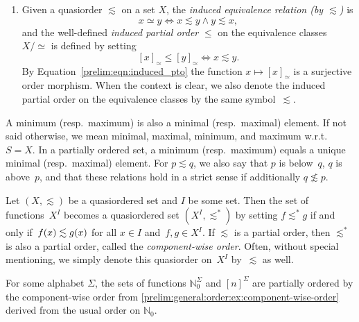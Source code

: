 \begin{enumerate}
 \item Given a quasiorder $\lesssim$ on a set $X$, the \emph{induced equivalence relation (by $\lesssim$)} is
 \begin{equation}\label{prelim:eqn:induced_eqrel}
 	x \simeq y \Leftrightarrow x \lesssim y \land y \lesssim x,
 \end{equation}
 and the well-defined \emph{induced partial order} $\le$
 on the equivalence classes $X / {\simeq}$ 
 is defined by setting
 \begin{equation}\label{prelim:eqn:induced_pto}
 	[x]_{\simeq} \le [y]_{\simeq} \Leftrightarrow x \lesssim y.
 \end{equation}  
 By Equation~\eqref{prelim:eqn:induced_pto}
 the function $x \mapsto [x]_{\simeq}$ is a surjective order morphism.
 When the context is clear, we also denote
 the induced partial order on the equivalence classes by the same symbol~$\lesssim$.
\end{enumerate}

A minimum (resp.~maximum) is also a minimal (resp.~maximal) element. 
If not said otherwise, 
we mean minimal, maximal, minimum, and maximum w.r.t.~$S = X$. 
In a partially ordered set, a minimum (resp.~maximum) equals a unique minimal (resp.~maximal) element.
For $p \lesssim q$, we also say that $p$ is below~$q$, $q$ is above~$p$,
and that  these relations hold in a strict sense if additionally $q \not\lesssim p$.


\begin{example}\label{prelim:general:order:ex:component-wise-order}
Let $(X, \lesssim)$ be a quasiordered set and $I$ be some set.
Then the set of functions~$X^I$ becomes a quasiordered set $(X^I, \lesssim^*)$
by setting $f \lesssim^*  g$ if and only if~$\applyfunc{x}{f} \lesssim \applyfunc{x}{g}$ for all $x \in I$
and~$f,g \in X^I$. If $\lesssim$ is a partial order, then $\lesssim^*$ is also a partial order,
called the \emph{component-wise order}.
Often, without special mentioning, 
we simply denote this quasiorder on~$X^I$ by~$\lesssim$ as well.
\end{example}
 
\begin{example}\label{prelim:ex:order:NzeroSigma-induced-pto}
	For some alphabet $\Sigma$, the sets of functions $\mathbb N_0^{\Sigma}$ and $[n]^{\Sigma}$
	are partially ordered
	by the component-wise order from \cref{prelim:general:order:ex:component-wise-order}
	derived from the usual order on $\mathbb N_0$.
\end{example}

